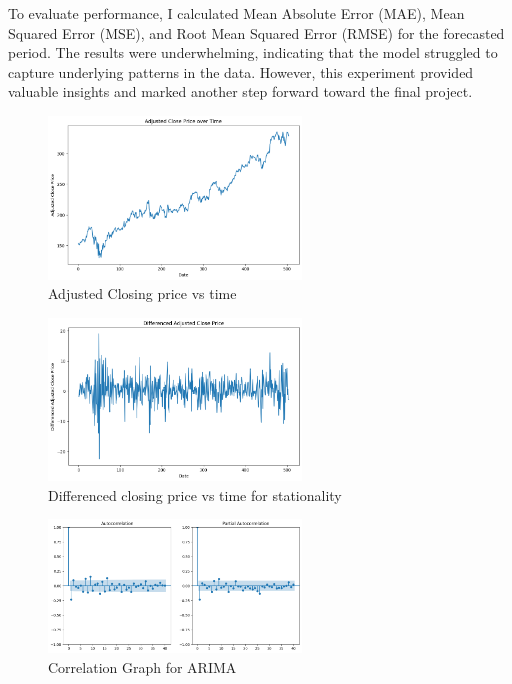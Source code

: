 \documentclass[12pt,a4paper]{article}
\begin{document}
To evaluate performance, I calculated Mean Absolute Error (MAE), Mean Squared Error (MSE), and Root Mean Squared Error (RMSE) for the forecasted period. The results were underwhelming, indicating that the model struggled to capture underlying patterns in the data. However, this experiment provided valuable insights and marked another step forward toward the final project.

\begin{figure}[!h]
    \centering
    \includegraphics[width=0.6\textwidth]{Week2_adjusted_close_graph.png} %
    \caption{Adjusted Closing price vs time}
    \label{fig5}
\end{figure}

\begin{figure}[!h]
    \centering
    \includegraphics[width=0.6\textwidth]{Week2_differenced_close_graph.png} %
    \caption{Differenced closing price vs time for stationality}
    \label{fig6}
\end{figure}

\begin{figure}[!h]
    \centering
    \includegraphics[width=0.6\textwidth]{Week2_correlation_graph.png} %
    \caption{Correlation Graph for ARIMA}
    \label{fig7}
\end{figure}
\end{document}

